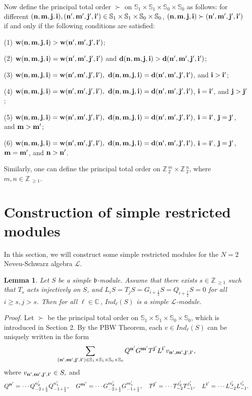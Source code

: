 \documentclass[12pt]{article}
\def\ssc{\scriptscriptstyle}
\def\Z{\mathbb{Z}{\ssc\,}}
\def\C{\mathbb{C}{\ssc\,}}
\numberwithin{equation}{section}
\newtheorem{lemm}[theo]{Lemma}
\begin{document}
Now define the principal total order $\succ $ on $\mathbb{S}_1\times \mathbb{S}_1\times\mathbb{S}_0\times \mathbb{S}_0$ as follows: for different ${\bf (n,m,j,i)},{\bf (n',m',j',i')}\in \mathbb{S}_1\times \mathbb{S}_1\times\mathbb{S}_0\times \mathbb{S}_0$, ${\bf (n,m,j,i)}\succ {\bf (n',m',j',i')}$ if and only if the following conditions are satisfied:

(1) $ {\bf w(n,m,j,i)}>{\bf w(n',m',j',i')}$;

(2) $ {\bf w(n,m,j,i)} = {\bf w(n',m',j',i')}$ and ${\bf d(n,m,j,i)}>{\bf d(n',m',j',i')}$;

(3) $ {\bf w(n,m,j,i)} = {\bf w(n',m',j',i')},$ ${\bf d(n,m,j,i)}={\bf d(n',m',j',i')}$, and ${\bf i}>{\bf i'}$;

(4)  $ {\bf w(n,m,j,i)} = {\bf w(n',m',j',i')},$ ${\bf d(n,m,j,i)}={\bf d(n',m',j',i')}$, ${\bf i}={\bf i'}$, and ${\bf j}>{\bf j'}$;

(5) $ {\bf w(n,m,j,i)} = {\bf w(n',m',j',i')},$  ${\bf d(n,m,j,i)}={\bf d(n',m',j',i')}$, ${\bf i}={\bf i'}$, ${\bf j}={\bf j'}$, and ${\bf m}>{\bf m'}$;

(6) $ {\bf w(n,m,j,i)} = {\bf w(n',m',j',i')},$ ${\bf d(n,m,j,i)}={\bf d(n',m',j',i')}$, ${\bf i}={\bf i'}$, ${\bf j}={\bf j'}$, ${\bf m}={\bf m'}$, and ${\bf n}>{\bf n'}$.


Similarly, one can define the principal total order on $\Z_2^m\times\Z_2^n$, where $m,n\in\Z_{\ge 1}$.





\section{Construction of simple restricted modules}
 In this section, we will construct some simple restricted modules for the $N=2$  Neveu-Schwarz algebra $\mathcal{L}$.
\begin{lemm}\label{Tb-irr}
Let $S$ be a simple $\mathfrak{b}$-module. Assume that there exists $s\in\Z_{\ge 1}$ such that $T_s$ acts injectively on $S$, and $L_iS=T_jS=G_{i+\frac{1}{2}}S=Q_{i+\frac{1}{2}}S=0$ for all $i\ge s,j>s$.
Then for all $\ell\in\C$, $Ind_\ell(S)$ is a simple $\mathcal{L}$-module.
\end{lemm}


{\it Proof.}   Let $\succ$ be the principal  total order on $\mathbb{S}_1\times \mathbb{S}_1\times \mathbb{S}_0\times \mathbb{S}_0$,  which is introduced in Section 2. By the PBW Theorem, each $v\in Ind_\ell(S)$ can be uniquely written in  the form
\begin{equation}\label{PBWform1}
\sum\limits_{({\bf n',m',j',i'})\in \mathbb{S}_1\times \mathbb{S}_1\times \mathbb{S}_0\times \mathbb{S}_0}Q^{\bf n'}G^{\bf m'}T^{\bf j'}L^{\bf i'}v_{\bf n',m',j',i'},
\end{equation}
 where $v_{{\bf n',m',j',i'}}\in S,$ and $$Q^{{\bf n'}}=\cdots Q_{-2+\frac{1}{2}}^{n'_{2}} Q_{-1+\frac{1}{2}}^{n'_{1}}, \quad
 G^{{\bf m'}}=\cdots G_{-2+\frac{1}{2}}^{m'_{2}} G_{-1+\frac{1}{2}}^{m'_{1}},\quad
 T^{{\bf j'}}=\cdots T_{-2}^{j'_{2}} T_{-1}^{j'_{1}},\quad
 L^{{\bf i'}}=\cdots L_{-2}^{i'_{2}} L_{-1}^{i'_{1}}.$$
\end{document}

